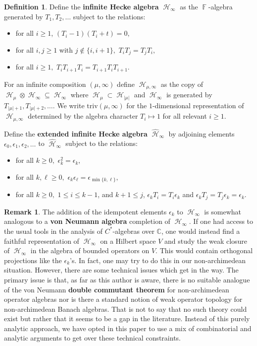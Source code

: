 \documentclass[12pt,reqno]{amsart}
\theoremstyle{definition}
\newtheorem{defn}[thm]{Definition}
\newtheorem{remark}{Remark}
\DeclareMathOperator{\bF}{\mathbb{F}}
\DeclareMathOperator{\cH}{\mathcal{H}}
\begin{document}
\begin{defn}\label{defn inf hecke}
    Define the \textbf{infinite Hecke algebra} $\cH_{\infty}$ as the $\bF$-algebra generated by $T_1,T_2,\dots$ subject to the relations: 
    \begin{itemize}
        \item for all $i\geq 1$, $(T_i-1)(T_i+t) = 0,$
        \item for all $i,j \geq 1$ with $j \notin \{i,i+1\},$ $T_iT_j = T_jT_i,$
        \item for all $i \geq 1,$ $T_iT_{i+1}T_i = T_{i+1}T_iT_{i+1}.$
    \end{itemize}

    For an infinite composition $(\mu,\infty)$ define $\cH_{\mu,\infty}$ as the copy of $\cH_{\mu} \otimes \cH_{\infty} \subseteq \cH_{\infty}$ where $\cH_{\mu} \subset \cH_{|\mu|}$ and $\cH_{\infty}$ is generated by $T_{|\mu|+1},T_{|\mu|+2},\dots .$ We write $\mathrm{triv}(\mu,\infty)$ for the $1$-dimensional representation of $\cH_{\mu,\infty}$ determined by the algebra character $T_i \mapsto 1$ for all relevant $i\geq 1.$

    Define the \textbf{extended infinite Hecke algebra} $\widehat{\cH}_{\infty}$ by adjoining elements $\epsilon_0,\epsilon_1,\epsilon_2,\dots$ to $\widehat{\cH}_{\infty}$ subject to the relations:
    \begin{itemize}
        \item for all $k \geq 0,$ $\epsilon_k^2 = \epsilon_k,$
        \item for all $k,\ell \geq 0,$ $\epsilon_{k}\epsilon_{\ell} = \epsilon_{\min\{k,\ell \} },$
        \item for all $k \geq 0,$ $1 \leq i \leq k-1$, and $k+1 \leq j$, $\epsilon_{k}T_i = T_i \epsilon_k$ and $\epsilon_k T_j = T_j \epsilon_{k} = \epsilon_k.$
    \end{itemize}
\end{defn}

\begin{remark}
    The addition of the idempotent elements $\epsilon_k$ to $\cH_{\infty}$ is somewhat analogous to a \textbf{von Neumann algebra} completion of $\cH_{\infty}.$ If one had access to the usual tools in the analysis of $C^{*}$-algebras over $\mathbb{C}$, one would instead find a faithful representation of $\cH_{\infty}$ on a Hilbert space $V$ and study the weak closure of $\cH_{\infty}$ in the algebra of bounded operators on $V$. This would contain orthogonal projections like the $\epsilon_k$'s. In fact, one may try to do this in our non-archimedean situation. However, there are some technical issues which get in the way. The primary issue is that, as far as this author is aware, there is no suitable analogue of the von Neumann \textbf{double commutant theorem} for non-archimedean operator algebras nor is there a standard notion of weak operator topology for non-archimedean Banach algebras. That is not to say that no such theory could exist but rather that it seems to be a gap in the literature. Instead of this purely analytic approach, we have opted in this paper to use a mix of combinatorial and analytic arguments to get over these technical constraints.
\end{remark}
\end{document}
